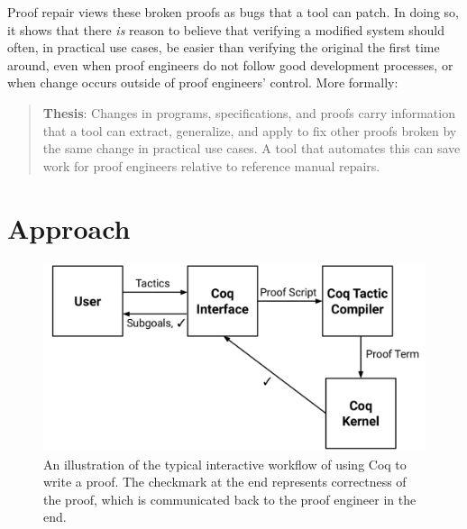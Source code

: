 Proof repair views these broken proofs as bugs that a tool can patch.
In doing so, it shows that there \textit{is} reason to believe that verifying a modified system should often, in practical use cases, be easier than verifying the original the first time around,
even when proof engineers do not follow good development processes,
or when change occurs outside of proof engineers' control.
More formally:

\begin{quote}
\textbf{Thesis}: Changes in programs, specifications, and proofs carry information that a tool can extract, generalize, and apply to fix other proofs broken by the same change in practical use cases. A tool that automates this can save work for proof engineers relative to reference manual repairs.
\end{quote}

\section{Approach}

\begin{figure}
\begin{center}
\includegraphics[scale=0.32]{Development}
\end{center}
\label{fig:workflow}
\caption{An illustration of the typical interactive workflow of using Coq to write a proof. The checkmark at the end
represents correctness of the proof, which is communicated back to the proof engineer in the end.}
\end{figure}



